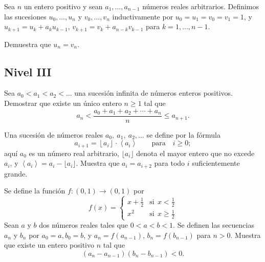 \documentclass[11pt]{scrartcl}
\begin{document}
\begin{problem}
    Sea $n$ un entero positivo y sean $a_1, \ldots, a_{n-1} $ números reales arbitrarios. Definimos las sucesiones $u_0, \ldots, u_n $ y $v_0, \ldots, v_n $ inductivamente por $u_0 = u_1  = v_0 = v_1 = 1$, y $u_{k+1} = u_k + a_k u_{k-1}$, $v_{k+1} = v_k + a_{n-k} v_{k-1}$ para $k=1, \ldots, n-1.$

Demuestra que $u_n = v_n.$
\end{problem}


\subsection{Nivel III}

\begin{problem}

    
    Sea $a_0 < a_1 < a_2 < \dots$ una sucesión infinita de números enteros positivos. Demostrar que existe un único entero $n \geq 1$ tal que
\[a_n < \frac{a_0+a_1+a_2+\cdots+a_n}{n} \leq a_{n+1}.\]
    
\end{problem}


\begin{problem}
     Una sucesión de números reales $ a_{0},\ a_{1},\ a_{2},\dots$ se define por la fórmula
\[ a_{i + 1} = \left\lfloor a_{i}\right\rfloor\cdot \left\langle a_{i}\right\rangle\qquad\text{para}\quad i\geq 0;
\]aquí $a_0$ es un número real arbitrario, $\lfloor a_i\rfloor$ denota el mayor entero que no excede $a_i$, y $\left\langle a_i\right\rangle=a_i-\lfloor a_i\rfloor$. Muestra que $a_i=a_{i+2}$ para todo $i$ suficientemente grande.
\end{problem}

\begin{problem}
     Se define la función $f:(0,1)\to (0,1)$ por\[\displaystyle f(x) = \left\{ \begin{array}{lr} x+\frac 12 & \text{si}\ \  x < \frac 12\\ x^2 & \text{si}\ \  x \ge \frac 12 \end{array} \right.\]Sean $a$ y $b$ dos números reales tales que $0 < a < b < 1$. Se definen las secuencias $a_n$ y $b_n$ por $a_0 = a, b_0 = b$, y $a_n = f( a_{n -1})$, $b_n = f (b_{n -1} )$ para $n > 0$. Muestra que existe un entero positivo $n$ tal que \[(a_n - a_{n-1})(b_n-b_{n-1})<0.\]
\end{problem}
\end{document}
